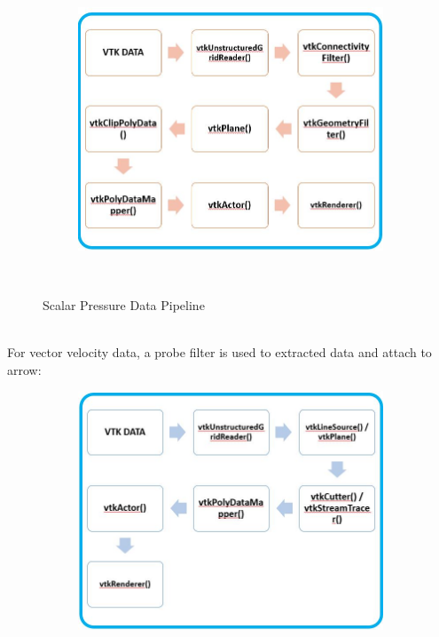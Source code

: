 \documentclass[
	12pt, %
]{fphw}
\begin{document}
\begin{enumerate}[(\itshape 1\normalfont)]
\begin{figure}[h]
\begin{subfigure}[h]{0.5\textwidth}
        \includegraphics[width=\textwidth]{3a.jpg}
        \label{fig:1c1}
    \end{subfigure}
    ~ 
    \caption{Scalar Pressure Data Pipeline}\label{fig:1c}
\end{figure}\\
For vector velocity data, a probe filter is used to extracted data and attach to arrow:
\begin{figure}[h]
    \centering
    \begin{subfigure}[h]{0.5\textwidth}
        \includegraphics[width=\textwidth]{3b.jpg}
        \label{fig:1c1}
    \end{subfigure}

\end{figure}
\end{enumerate}
\end{document}
